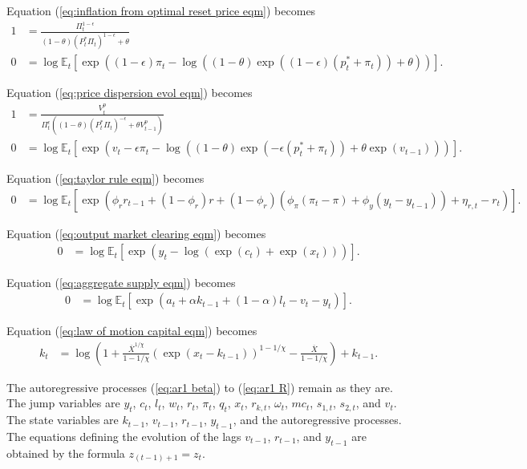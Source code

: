 \documentclass[12 pt, oneside]{article}
\theoremstyle{definition}
\theoremstyle{definition}
\theoremstyle{definition}
\newcommand{\E}{\mathbb{E}}
\begin{document}
Equation (\ref{eq:inflation from optimal reset price eqm}) becomes
\begin{align*}
  1 & = \frac{\Pi_t^{1 - \epsilon}}{(1 - \theta)(P_t^*\Pi_t)^{1 - \epsilon} + \theta}\\
  0 & = \log\E_t\left[\exp\left((1 - \epsilon)\pi_t - \log((1 - \theta) \exp((1 - \epsilon)(p_t^* + \pi_t)) + \theta)\right)\right].
\end{align*}

Equation (\ref{eq:price dispersion evol eqm}) becomes
\begin{align*}
  1 & = \frac{V_t^p}{\Pi_t^\epsilon((1 - \theta) (P_t^*\Pi_t)^{-\epsilon} + \theta V_{t - 1}^p)}\\
  0 & = \log\E_t\left[\exp\left(v_t - \epsilon \pi_t - \log((1 - \theta) \exp(-\epsilon(p_t^* + \pi_t)) + \theta \exp(v_{t - 1}))\right)\right].
\end{align*}

Equation (\ref{eq:taylor rule eqm}) becomes
\begin{align*}
  0 & = \log\E_t\left[\exp\left(\phi_r r_{t - 1} + (1 - \phi_r)r + (1 - \phi_r)(\phi_\pi(\pi_t - \pi) + \phi_y(y_t - y_{t - 1})) + \eta_{r, t} - r_t\right)\right].
\end{align*}

Equation (\ref{eq:output market clearing eqm}) becomes
\begin{align*}
  0 & = \log\E_t\left[\exp(y_t - \log(\exp(c_t) + \exp(x_t)))\right].
\end{align*}

Equation (\ref{eq:aggregate supply eqm}) becomes
\begin{align*}
  0 & = \log\E_t\left[\exp(a_t + \alpha k_{t - 1} + (1 - \alpha)l_t - v_t - y_t)\right].
\end{align*}

Equation (\ref{eq:law of motion capital eqm}) becomes
\begin{align*}
  k_t & = \log\left(1 + \frac{\overline{X}^{1 / \chi}}{1 - 1 / \chi}(\exp(x_t - k_{t - 1}))^{1 - 1 / \chi} - \frac{\overline{X}}{1 - 1 / \chi} \right) + k_{t - 1}.
\end{align*}

The autoregressive processes (\ref{eq:ar1 beta}) to (\ref{eq:ar1 R}) remain as they are.\\

The jump variables are $y_t$, $c_t$, $l_t$, $w_t$, $r_t$, $\pi_t$, $q_t$, $x_t$, $r_{k, t}$, $\omega_t$, $mc_t$, $s_{1, t}$, $s_{2, t}$, and $v_t$.
The state variables are $k_{t - 1}$, $v_{t - 1}$, $r_{t - 1}$, $y_{t - 1}$, and the autoregressive processes. The equations defining the evolution of the lags $v_{t - 1}$, $r_{t - 1}$, and $y_{t - 1}$ are obtained by the formula $z_{(t - 1) + 1} = z_t$.
\end{document}
